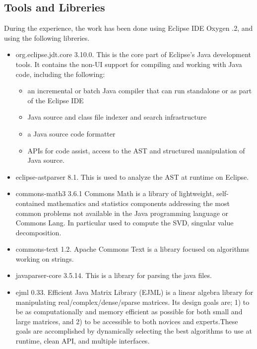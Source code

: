 \subsection{Tools and Libreries}
During the experience, the work has been done using Eclipse IDE Oxygen .2, and using the following libreries.
\begin{itemize}
\item org.eclipse.jdt.core 3.10.0. 
This is the core part of Eclipse's Java development tools. It contains the non-UI support for compiling and working with Java code, including the following:
	\begin{itemize}
	\item an incremental or batch Java compiler that can run standalone or as part of the Eclipse IDE
	\item Java source and class file indexer and search infrastructure
	\item a Java source code formatter
	\item APIs for code assist, access to the AST and structured manipulation of Java source.
	\end{itemize}
\item eclipse-astparser 8.1. This is used to analyze the AST at runtime on Eclipse.
\item commons-math3 3.6.1 Commons Math is a library of lightweight, self-contained mathematics and statistics components addressing the most common problems not available in the Java programming language or Commons Lang. 
In particular used to compute the SVD, singular value decomposition.
\item commons-text 1.2. Apache Commons Text is a library focused on algorithms working on strings. 
\item javaparser-core 3.5.14. This is a library for parsing the java files.
\item ejml 0.33. Efficient Java Matrix Library (EJML) is a linear algebra library for manipulating real/complex/dense/sparse matrices. Its design goals are; 1) to be as computationally and memory efficient as possible for both small and large matrices, and 2) to be accessible to both novices and experts.These goals are accomplished by dynamically selecting the best algorithms to use at runtime, clean API, and multiple interfaces.
\end{itemize}

